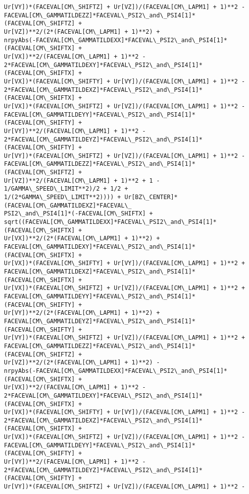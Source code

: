 \documentclass[landscape,letterpaper,10pt,english]{article}
\begin{document}
\begin{Verbatim}[commandchars=\\\{\}]
Ur[VY])*(FACEVAL[CM\_SHIFTZ] + Ur[VZ])/(FACEVAL[CM\_LAPM1] + 1)**2 -
FACEVAL[CM\_GAMMATILDEZZ]*FACEVAL\_PSI2\_and\_PSI4[1]*(FACEVAL[CM\_SHIFTZ] +
Ur[VZ])**2/(2*(FACEVAL[CM\_LAPM1] + 1)**2) +
nrpyAbs(-FACEVAL[CM\_GAMMATILDEXX]*FACEVAL\_PSI2\_and\_PSI4[1]*(FACEVAL[CM\_SHIFTX] +
Ur[VX])**2/(FACEVAL[CM\_LAPM1] + 1)**2 -
2*FACEVAL[CM\_GAMMATILDEXY]*FACEVAL\_PSI2\_and\_PSI4[1]*(FACEVAL[CM\_SHIFTX] +
Ur[VX])*(FACEVAL[CM\_SHIFTY] + Ur[VY])/(FACEVAL[CM\_LAPM1] + 1)**2 -
2*FACEVAL[CM\_GAMMATILDEXZ]*FACEVAL\_PSI2\_and\_PSI4[1]*(FACEVAL[CM\_SHIFTX] +
Ur[VX])*(FACEVAL[CM\_SHIFTZ] + Ur[VZ])/(FACEVAL[CM\_LAPM1] + 1)**2 -
FACEVAL[CM\_GAMMATILDEYY]*FACEVAL\_PSI2\_and\_PSI4[1]*(FACEVAL[CM\_SHIFTY] +
Ur[VY])**2/(FACEVAL[CM\_LAPM1] + 1)**2 -
2*FACEVAL[CM\_GAMMATILDEYZ]*FACEVAL\_PSI2\_and\_PSI4[1]*(FACEVAL[CM\_SHIFTY] +
Ur[VY])*(FACEVAL[CM\_SHIFTZ] + Ur[VZ])/(FACEVAL[CM\_LAPM1] + 1)**2 -
FACEVAL[CM\_GAMMATILDEZZ]*FACEVAL\_PSI2\_and\_PSI4[1]*(FACEVAL[CM\_SHIFTZ] +
Ur[VZ])**2/(FACEVAL[CM\_LAPM1] + 1)**2 + 1 - 1/GAMMA\_SPEED\_LIMIT**2)/2 + 1/2 +
1/(2*GAMMA\_SPEED\_LIMIT**2)))) + Ur[BZ\_CENTER]*(FACEVAL[CM\_GAMMATILDEXZ]*FACEVAL\_
PSI2\_and\_PSI4[1]*(-FACEVAL[CM\_SHIFTX] +
sqrt((FACEVAL[CM\_GAMMATILDEXX]*FACEVAL\_PSI2\_and\_PSI4[1]*(FACEVAL[CM\_SHIFTX] +
Ur[VX])**2/(2*(FACEVAL[CM\_LAPM1] + 1)**2) +
FACEVAL[CM\_GAMMATILDEXY]*FACEVAL\_PSI2\_and\_PSI4[1]*(FACEVAL[CM\_SHIFTX] +
Ur[VX])*(FACEVAL[CM\_SHIFTY] + Ur[VY])/(FACEVAL[CM\_LAPM1] + 1)**2 +
FACEVAL[CM\_GAMMATILDEXZ]*FACEVAL\_PSI2\_and\_PSI4[1]*(FACEVAL[CM\_SHIFTX] +
Ur[VX])*(FACEVAL[CM\_SHIFTZ] + Ur[VZ])/(FACEVAL[CM\_LAPM1] + 1)**2 +
FACEVAL[CM\_GAMMATILDEYY]*FACEVAL\_PSI2\_and\_PSI4[1]*(FACEVAL[CM\_SHIFTY] +
Ur[VY])**2/(2*(FACEVAL[CM\_LAPM1] + 1)**2) +
FACEVAL[CM\_GAMMATILDEYZ]*FACEVAL\_PSI2\_and\_PSI4[1]*(FACEVAL[CM\_SHIFTY] +
Ur[VY])*(FACEVAL[CM\_SHIFTZ] + Ur[VZ])/(FACEVAL[CM\_LAPM1] + 1)**2 +
FACEVAL[CM\_GAMMATILDEZZ]*FACEVAL\_PSI2\_and\_PSI4[1]*(FACEVAL[CM\_SHIFTZ] +
Ur[VZ])**2/(2*(FACEVAL[CM\_LAPM1] + 1)**2) -
nrpyAbs(-FACEVAL[CM\_GAMMATILDEXX]*FACEVAL\_PSI2\_and\_PSI4[1]*(FACEVAL[CM\_SHIFTX] +
Ur[VX])**2/(FACEVAL[CM\_LAPM1] + 1)**2 -
2*FACEVAL[CM\_GAMMATILDEXY]*FACEVAL\_PSI2\_and\_PSI4[1]*(FACEVAL[CM\_SHIFTX] +
Ur[VX])*(FACEVAL[CM\_SHIFTY] + Ur[VY])/(FACEVAL[CM\_LAPM1] + 1)**2 -
2*FACEVAL[CM\_GAMMATILDEXZ]*FACEVAL\_PSI2\_and\_PSI4[1]*(FACEVAL[CM\_SHIFTX] +
Ur[VX])*(FACEVAL[CM\_SHIFTZ] + Ur[VZ])/(FACEVAL[CM\_LAPM1] + 1)**2 -
FACEVAL[CM\_GAMMATILDEYY]*FACEVAL\_PSI2\_and\_PSI4[1]*(FACEVAL[CM\_SHIFTY] +
Ur[VY])**2/(FACEVAL[CM\_LAPM1] + 1)**2 -
2*FACEVAL[CM\_GAMMATILDEYZ]*FACEVAL\_PSI2\_and\_PSI4[1]*(FACEVAL[CM\_SHIFTY] +
Ur[VY])*(FACEVAL[CM\_SHIFTZ] + Ur[VZ])/(FACEVAL[CM\_LAPM1] + 1)**2 -

\end{Verbatim}
\end{document}
